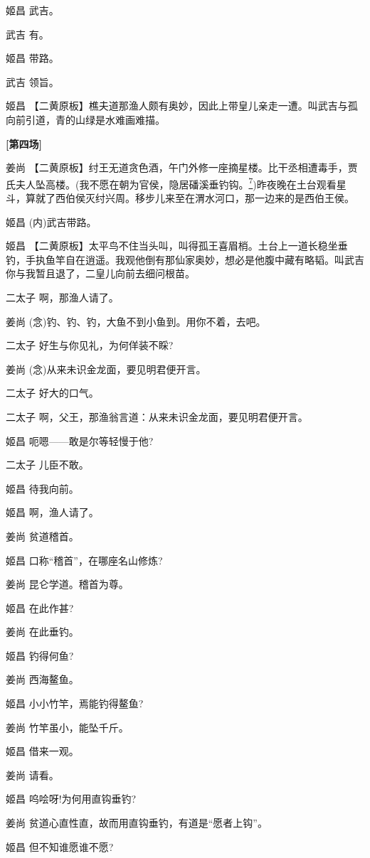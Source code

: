 {姬昌 武吉。

武吉 有。

姬昌 带路。

武吉 领旨。

姬昌
【二黄原板】樵夫道那渔人颇有奥妙，因此上带皇儿亲走一遭。叫武吉与孤向前引道，青的山绿是水难画难描。

{\centerline{\textbf{{[}\hei 第四场{]}}}}

姜尚
【二黄原板】纣王无道贪色酒，午门外修一座摘星楼。比干丞相遭毒手，贾氏夫人坠高楼。(我不愿在朝为官侯，隐居磻溪垂钓钩。\protect\hyperlink{fn7}{\textsuperscript{7}})昨夜晚在土台观看星斗，算就了西伯侯灭纣兴周。移步儿来至在渭水河口，那一边来的是西伯王侯。

姬昌 (内)武吉带路。

姬昌
【二黄原板】太平鸟不住当头叫，叫得孤王喜眉梢。土台上一道长稳坐垂钓，手执鱼竿自在逍遥。我观他倒有那仙家奥妙，想必是他腹中藏有略韬。叫武吉你与我暂且退了，二皇儿向前去细问根苗。

二太子 啊，那渔人请了。

姜尚 (念)钓、钓、钓，大鱼不到小鱼到。用你不着，去吧。

二太子 好生与你见礼，为何佯装不睬?

姜尚 (念)从来未识金龙面，要见明君便开言。

二太子 好大的口气。

二太子 啊，父王，那渔翁言道：从来未识金龙面，要见明君便开言。

姬昌 呃嗯------敢是尔等轻慢于他?

二太子 儿臣不敢。

姬昌 待我向前。

姬昌 啊，渔人请了。

姜尚 贫道稽首。

姬昌 口称``稽首''，在哪座名山修炼?

姜尚 昆仑学道。稽首为尊。

姬昌 在此作甚?

姜尚 在此垂钓。

姬昌 钓得何鱼?

姜尚 西海鳌鱼。

姬昌 小小竹竿，焉能钓得鳌鱼?

姜尚 竹竿虽小，能坠千斤。

姬昌 借来一观。

姜尚 请看。

姬昌 呜哙呀!为何用直钩垂钓?

姜尚 贫道心直性直，故而用直钩垂钓，有道是``愿者上钩''。

姬昌 但不知谁愿谁不愿?

}
